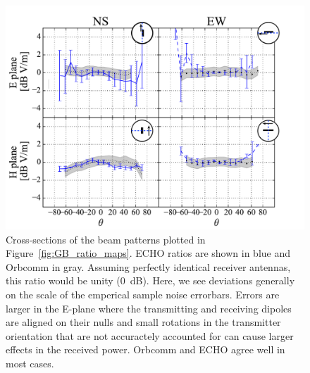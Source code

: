 \documentclass[preprint2,numberedappendix,tighten,twocolappendix]{aastex6}
\begin{document}
\begin{figure}
\begin{minipage}{0.45\textwidth}
\includegraphics[width=\columnwidth]{figures/GB_ratio_slice_5dB.pdf}
\caption{Cross-sections of the beam patterns plotted in Figure~\ref{fig:GB_ratio_maps}.  ECHO ratios are shown in blue and Orbcomm in gray.     Assuming perfectly identical receiver antennas, this ratio would be unity (0~dB). Here, we see deviations generally on the scale of the emperical sample noise errorbars.  Errors are larger in the E-plane where the transmitting and receiving dipoles are aligned on their nulls and small rotations in the transmitter orientation that are not accuractely accounted for can cause larger effects in the received power.  Orbcomm and ECHO agree well in most cases.
\label{fig:GB_ratio_slices}}
\end{minipage}\hfill
\end{figure}




\end{document}

